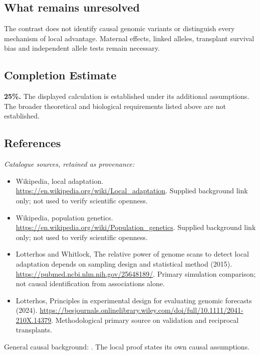 \documentclass[11pt]{article}
\begin{document}
\subsection{What remains unresolved}
The contrast does not identify causal genomic variants or distinguish every mechanism of local advantage. Maternal effects, linked alleles, transplant survival bias and independent allele tests remain necessary.
\subsection{Completion Estimate}
\textbf{25\%.} The displayed calculation is established under its additional assumptions. The broader theoretical and biological requirements listed above are not established.
\subsection{References}
\noindent\emph{Catalogue sources, retained as provenance:}
\begin{itemize}
\item Wikipedia, local adaptation. \url{https://en.wikipedia.org/wiki/Local_adaptation}. Supplied background link only; not used to verify scientific openness.
\item Wikipedia, population genetics. \url{https://en.wikipedia.org/wiki/Population_genetics}. Supplied background link only; not used to verify scientific openness.
\item Lotterhos and Whitlock, The relative power of genome scans to detect local adaptation depends on sampling design and statistical method (2015). \url{https://pubmed.ncbi.nlm.nih.gov/25648189/}. Primary simulation comparison; not causal identification from associations alone.
\item Lotterhos, Principles in experimental design for evaluating genomic forecasts (2024). \url{https://besjournals.onlinelibrary.wiley.com/doi/full/10.1111/2041-210X.14379}. Methodological primary source on validation and reciprocal transplants.
\end{itemize}
\noindent General causal background: \cite{pearl}. The local proof states its own causal assumptions.
\clearpage


\appendix
\end{document}
